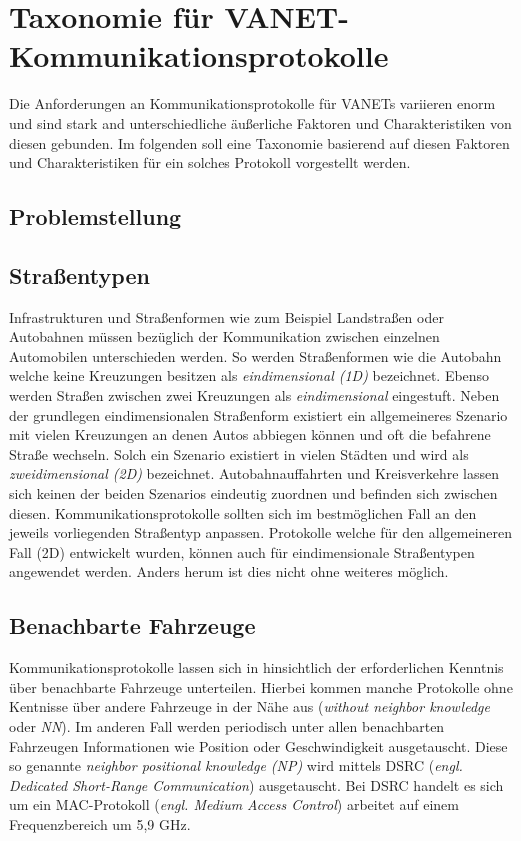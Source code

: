 \documentclass[english,runningheads,a4paper]{llncs}[2018/03/10]
\begin{document}
\section{Taxonomie für VANET-Kommunikationsprotokolle}
\label{sec:taxcommunicationprotocol}
Die Anforderungen an Kommunikationsprotokolle für VANETs variieren enorm und sind stark and unterschiedliche äußerliche Faktoren und Charakteristiken von diesen gebunden.
Im folgenden soll eine Taxonomie basierend auf diesen Faktoren und Charakteristiken für ein solches Protokoll vorgestellt werden.

\subsection{Problemstellung}

\subsection{Straßentypen}
Infrastrukturen und Straßenformen wie zum Beispiel Landstraßen oder Autobahnen müssen bezüglich der Kommunikation zwischen einzelnen Automobilen unterschieden werden.
So werden Straßenformen wie die Autobahn welche keine Kreuzungen besitzen als \textit{eindimensional (1D)} bezeichnet.
Ebenso werden Straßen zwischen zwei Kreuzungen als \textit{eindimensional} eingestuft.
Neben der grundlegen eindimensionalen Straßenform existiert ein allgemeineres Szenario mit vielen Kreuzungen an denen Autos abbiegen können und oft die befahrene Straße wechseln.
Solch ein Szenario existiert in vielen Städten und wird als \textit{zweidimensional (2D)} bezeichnet.
Autobahnauffahrten und Kreisverkehre lassen sich keinen der beiden Szenarios eindeutig zuordnen und befinden sich zwischen diesen.
Kommunikationsprotokolle sollten sich im bestmöglichen Fall an den jeweils vorliegenden Straßentyp anpassen.
Protokolle welche für den allgemeineren Fall (2D) entwickelt wurden, können auch für eindimensionale Straßentypen angewendet werden.
Anders herum ist dies nicht ohne weiteres möglich.

\subsection{Benachbarte Fahrzeuge}
Kommunikationsprotokolle lassen sich in hinsichtlich der erforderlichen Kenntnis über benachbarte Fahrzeuge unterteilen.
Hierbei kommen manche Protokolle ohne Kentnisse über andere Fahrzeuge in der Nähe aus (\textit{without neighbor knowledge} oder \textit{NN}).
Im anderen Fall werden periodisch unter allen benachbarten Fahrzeugen Informationen wie Position oder Geschwindigkeit ausgetauscht.
Diese so genannte \textit{neighbor positional knowledge (NP)} wird mittels DSRC (\textit{engl. Dedicated Short-Range Communication}) ausgetauscht.
Bei DSRC handelt es sich um ein MAC-Protokoll (\textit{engl. Medium Access Control}) arbeitet auf einem Frequenzbereich um 5,9 GHz.
\end{document}
